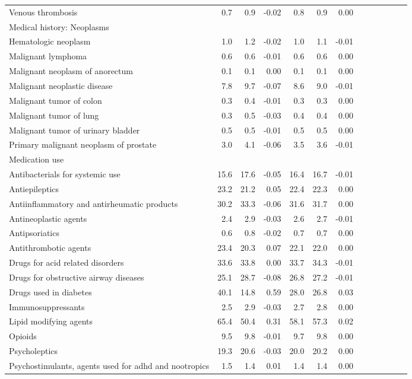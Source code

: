 \documentclass[11pt,]{article}
\begin{document}
\begin{longtable}{lrrrrrrrrrrrr}
      Venous thrombosis &  0.7 &  0.9 & -0.02 &  0.8 &  0.9 &  0.00 \\ 
  Medical history: Neoplasms &    &    &     &    &    &     \\ 
      Hematologic neoplasm &  1.0 &  1.2 & -0.02 &  1.0 &  1.1 & -0.01 \\ 
      Malignant lymphoma &  0.6 &  0.6 & -0.01 &  0.6 &  0.6 &  0.00 \\ 
      Malignant neoplasm of anorectum &  0.1 &  0.1 &  0.00 &  0.1 &  0.1 &  0.00 \\ 
      Malignant neoplastic disease &  7.8 &  9.7 & -0.07 &  8.6 &  9.0 & -0.01 \\ 
      Malignant tumor of colon &  0.3 &  0.4 & -0.01 &  0.3 &  0.3 &  0.00 \\ 
      Malignant tumor of lung &  0.3 &  0.5 & -0.03 &  0.4 &  0.4 &  0.00 \\ 
      Malignant tumor of urinary bladder &  0.5 &  0.5 & -0.01 &  0.5 &  0.5 &  0.00 \\ 
      Primary malignant neoplasm of prostate &  3.0 &  4.1 & -0.06 &  3.5 &  3.6 & -0.01 \\ 
  Medication use &    &    &     &    &    &     \\ 
      Antibacterials for systemic use & 15.6 & 17.6 & -0.05 & 16.4 & 16.7 & -0.01 \\ 
      Antiepileptics & 23.2 & 21.2 &  0.05 & 22.4 & 22.3 &  0.00 \\ 
      Antiinflammatory and antirheumatic products & 30.2 & 33.3 & -0.06 & 31.6 & 31.7 &  0.00 \\ 
      Antineoplastic agents &  2.4 &  2.9 & -0.03 &  2.6 &  2.7 & -0.01 \\ 
      Antipsoriatics &  0.6 &  0.8 & -0.02 &  0.7 &  0.7 &  0.00 \\ 
      Antithrombotic agents & 23.4 & 20.3 &  0.07 & 22.1 & 22.0 &  0.00 \\ 
      Drugs for acid related disorders & 33.6 & 33.8 &  0.00 & 33.7 & 34.3 & -0.01 \\ 
      Drugs for obstructive airway diseases & 25.1 & 28.7 & -0.08 & 26.8 & 27.2 & -0.01 \\ 
      Drugs used in diabetes & 40.1 & 14.8 &  0.59 & 28.0 & 26.8 &  0.03 \\ 
      Immunosuppressants &  2.5 &  2.9 & -0.03 &  2.7 &  2.8 &  0.00 \\ 
      Lipid modifying agents & 65.4 & 50.4 &  0.31 & 58.1 & 57.3 &  0.02 \\ 
      Opioids &  9.5 &  9.8 & -0.01 &  9.7 &  9.8 &  0.00 \\ 
      Psycholeptics & 19.3 & 20.6 & -0.03 & 20.0 & 20.2 &  0.00 \\ 
      Psychostimulants, agents used for adhd and nootropics &  1.5 &  1.4 &  0.01 &  1.4 &  1.4 &  0.00 \\ 
   \bottomrule\end{longtable}
\end{document}
